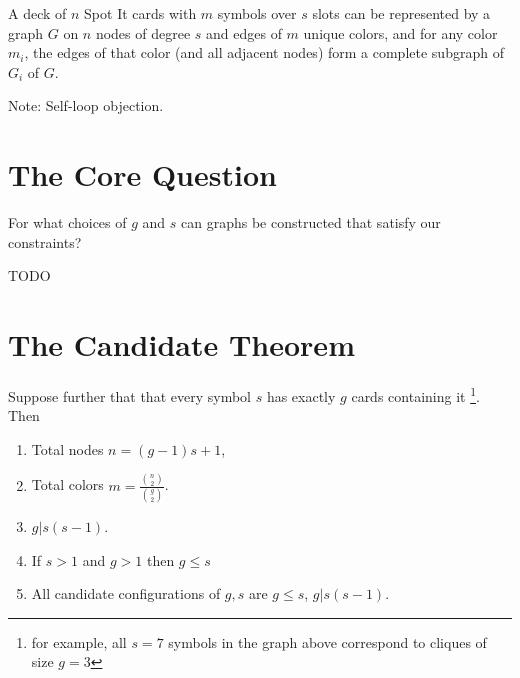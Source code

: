 \documentclass[11pt, oneside]{article} 	%
\begin{document}
\begin{framed}
A deck of $n$ Spot It cards with $m$ symbols over $s$ slots can be represented by a graph $G$ on $n$ nodes of degree $s$ and edges of $m$ unique colors, and for any color $m_i$, the edges of that color (and all adjacent nodes) form a complete subgraph of $G_i$ of $G$. 
\end{framed}

Note: Self-loop objection.

\section{The Core Question}

\begin{framed}
For what choices of $g$ and $s$ can graphs be constructed that satisfy our constraints? 
\end{framed}

TODO

\section{The Candidate Theorem}

\begin{framed}
Suppose further that that every symbol $s$ has exactly $g$ cards containing it \footnote{for example, all $s=7$ symbols in the graph above correspond to cliques of size $g=3$}.  Then \begin{enumerate}
\item Total nodes $n = (g-1)s + 1$, 
\item Total colors $m = \frac{{n \choose 2}}{{g \choose 2}}$.
\item $g | s(s-1)$.
\item If $s >1 $ and $g > 1$ then $g \leq s$ 
\item All candidate configurations of $g, s$ are $g \leq s$, $g | s(s-1)$.
\end{enumerate}
\end{framed}
\end{document}
